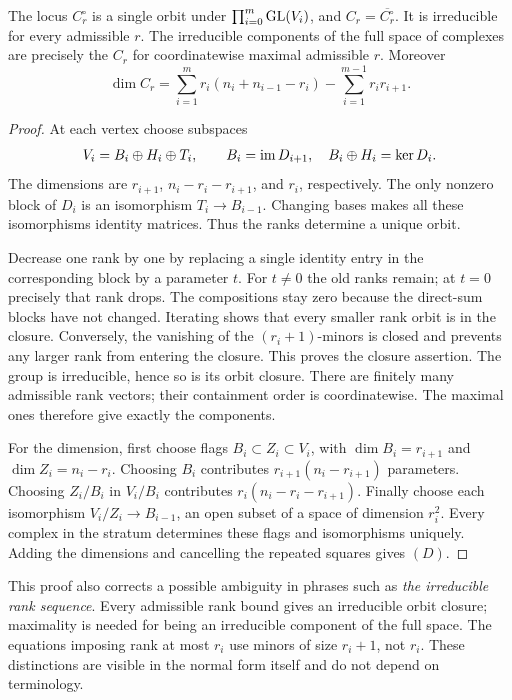 \begin{proposition}
The locus \(C_r^\circ\) is a single orbit under
\(\prod_{i=0}^m\operatorname{GL}(V_i)\), and
\(C_r=\overline{C_r^\circ}\).
It is irreducible for every admissible \(r\).
The irreducible components of the full space
of complexes are precisely the \(C_r\)
for coordinatewise maximal admissible \(r\).
Moreover
\[
 \dim C_r
  =\sum_{i=1}^m r_i(n_i+n_{i-1}-r_i)
        -\sum_{i=1}^{m-1}r_i r_{i+1}.
 \tag{D}
\]
\end{proposition}
\begin{proof}
At each vertex choose subspaces
\[
 V_i=B_i\oplus H_i\oplus T_i,\qquad
 B_i=\operatorname{im} D_{i+1},\quad B_i\oplus H_i=\ker D_i.
\]
The dimensions are \(r_{i+1}\),
\(n_i-r_i-r_{i+1}\), and \(r_i\),
respectively.  The only nonzero block of \(D_i\)
is an isomorphism \(T_i\to B_{i-1}\).
Changing bases makes all these isomorphisms
identity matrices.  Thus the ranks determine
a unique orbit.

Decrease one rank by one by replacing a
single identity entry in the corresponding
block by a parameter \(t\).  For \(t\ne0\)
the old ranks remain; at \(t=0\) precisely
that rank drops.  The compositions stay zero
because the direct-sum blocks have not changed.
Iterating shows that every smaller rank orbit
is in the closure.  Conversely, the vanishing
of the \((r_i+1)\)-minors is closed and prevents
any larger rank from entering the closure.
This proves the closure assertion.
The group is irreducible, hence so is its
orbit closure.  There are finitely many
admissible rank vectors; their containment
order is coordinatewise.  The maximal ones
therefore give exactly the components.

For the dimension, first choose flags
\(B_i\subset Z_i\subset V_i\), with
\(\dim B_i=r_{i+1}\) and \(\dim Z_i=n_i-r_i\).
Choosing \(B_i\) contributes
\(r_{i+1}(n_i-r_{i+1})\) parameters.
Choosing \(Z_i/B_i\) in \(V_i/B_i\)
contributes
\(r_i(n_i-r_i-r_{i+1})\).
Finally choose each isomorphism
\(V_i/Z_i\to B_{i-1}\), an open subset
of a space of dimension \(r_i^2\).
Every complex in the stratum determines
these flags and isomorphisms uniquely.
Adding the dimensions and cancelling
the repeated squares gives \((D)\).
\end{proof}

This proof also corrects a possible ambiguity in
phrases such as \emph{the irreducible rank sequence}.
Every admissible rank bound gives an irreducible
orbit closure; maximality is needed for being
an irreducible component of the full space.
The equations imposing rank at most \(r_i\)
use minors of size \(r_i+1\), not \(r_i\).
These distinctions are visible in the normal
form itself and do not depend on terminology.

